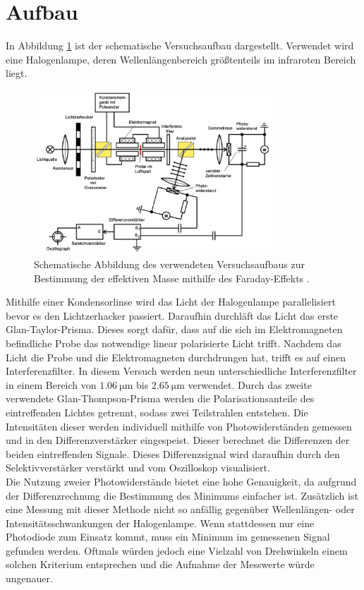 \section{Aufbau}
In Abbildung \ref{fig:schemAufbau} ist der schematische Versuchsaufbau dargestellt. Verwendet wird
eine Halogenlampe, deren Wellenlängenbereich größtenteils im infraroten Bereich liegt.
\begin{figure}[H]
    \centering
    \includegraphics[width=0.8\textwidth]{images/SchemAufbau.pdf}
    \caption{Schematische Abbildung des verwendeten Versuchsaufbaus zur Bestimmung der effektiven
     Masse mithilfe des Faraday-Effekts \cite{anleitung}.}
    \label{fig:schemAufbau}
\end{figure} \noindent
Mithilfe einer Kondensorlinse wird das Licht der Halogenlampe parallelisiert bevor es den Lichtzerhacker passiert.
Daraufhin durchläft das Licht das erste Glan-Taylor-Prisma. Dieses sorgt dafür, dass auf die sich im
Elektromagneten befindliche Probe das notwendige linear polarisierte Licht trifft.
Nachdem das Licht die Probe und die Elektromagneten durchdrungen hat, trifft es auf einen Interferenzfilter.
In diesem Versuch werden neun unterschiedliche Interferenzfilter in einem Bereich von $\SI{1.06}{\micro\meter}$ bis $\SI{2.65}{\micro\meter}$
verwendet. Durch das zweite verwendete Glan-Thompson-Prisma werden die Polarisationsanteile des
eintreffenden Lichtes getrennt, sodass zwei Teilstrahlen entstehen. Die Intensitäten dieser werden
individuell mithilfe von Photowiderständen gemessen und in den Differenzverstärker eingespeist. Dieser
berechnet die Differenzen der beiden eintreffenden Signale.
Dieses Differenzsignal wird daraufhin durch den Selektivverstärker verstärkt und vom Oszilloskop visualisiert.\\
Die Nutzung zweier Photowiderstände bietet eine hohe Genauigkeit, da aufgrund der Differenzrechnung die
Bestimmung des Minimums einfacher ist. Zusätzlich ist eine Messung mit dieser Methode nicht so anfällig
gegenüber Wellenlängen- oder Intensitätsschwankungen der Halogenlampe.
Wenn stattdessen nur eine Photodiode zum Einsatz kommt, muss ein Minimum im gemessenen Signal gefunden
werden. Oftmals würden jedoch eine Vielzahl von Drehwinkeln einem solchen Kriterium entsprechen
und die Aufnahme der Messwerte würde ungenauer.

